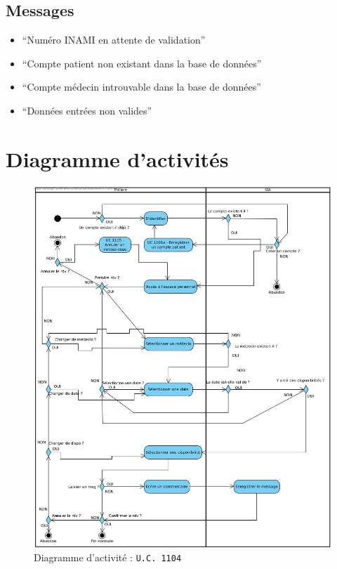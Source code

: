 \subsection{Messages}
\begin{itemize}
	\item ``Numéro INAMI en attente de validation''
	\item ``Compte patient non existant dans la base de données''
	\item ``Compte médecin introuvable dans la base de données''
	\item ``Données entrées non valides''
\end{itemize}
\newpage

\section{Diagramme d'activités}
\begin{figure}[hb]
	\centering
	\includegraphics[scale=0.4]{MCT/activiteUC1104.jpg}
	\caption{Diagramme d'activité : \texttt{U.C. 1104}}
	\label{fig:act1104}
\end{figure}
\newpage

